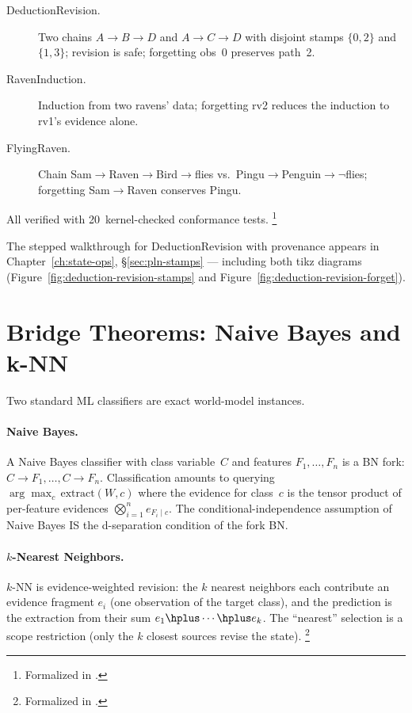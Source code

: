 \documentclass[11pt,openany]{report}
\begin{document}
\begin{description}
\item[DeductionRevision.]  Two chains $A \to B \to D$ and
  $A \to C \to D$ with disjoint stamps $\{0,2\}$ and $\{1,3\}$;
  revision is safe; forgetting obs~0 preserves path~2.

\item[RavenInduction.]  Induction from two ravens' data; forgetting
  rv2 reduces the induction to rv1's evidence alone.

\item[FlyingRaven.]  Chain Sam$\to$Raven$\to$Bird$\to$flies vs.\
  Pingu$\to$Penguin$\to\neg$flies; forgetting Sam$\to$Raven
  conserves Pingu.
\end{description}

\noindent
All verified with 20~kernel-checked conformance tests.%
\footnote{Formalized in
.}

The stepped walkthrough for DeductionRevision with provenance
appears in Chapter~\ref{ch:state-ops},
\S\ref{sec:pln-stamps} --- including both tikz diagrams
(Figure~\ref{fig:deduction-revision-stamps} and
Figure~\ref{fig:deduction-revision-forget}).


\section{Bridge Theorems: Naive Bayes and k-NN}
\label{sec:bridge-nb-knn}

Two standard ML classifiers are exact world-model instances.

\paragraph{Naive Bayes.}
A Naive Bayes classifier with class variable~$C$ and features
$F_1, \ldots, F_n$ is a BN fork: $C \to F_1, \ldots, C \to F_n$.
Classification amounts to querying
$\arg\max_c \,\mathrm{extract}(W, c)$ where the evidence for class~$c$
is the tensor product of per-feature evidences
$\bigotimes_{i=1}^n e_{F_i \mid c}$.  The conditional-independence
assumption of Naive Bayes IS the d-separation condition of the fork BN.

\paragraph{$k$-Nearest Neighbors.}
$k$-NN is evidence-weighted revision: the $k$ nearest neighbors each
contribute an evidence fragment $e_i$ (one observation of the target
class), and the prediction is the extraction from their sum
$e_1 \hplus \cdots \hplus e_k$.  The ``nearest'' selection is a scope
restriction (only the $k$ closest sources revise the state).%
\footnote{Formalized in
.}
\end{document}
